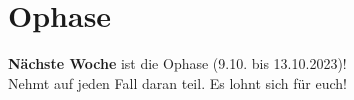 \section{Ophase}
\begin{frame}
    \slidehead
    \textbf{Nächste Woche} ist die Ophase (9.10. bis 13.10.2023)! \\
    Nehmt auf jeden Fall daran teil. Es lohnt sich für euch!
\end{frame}


